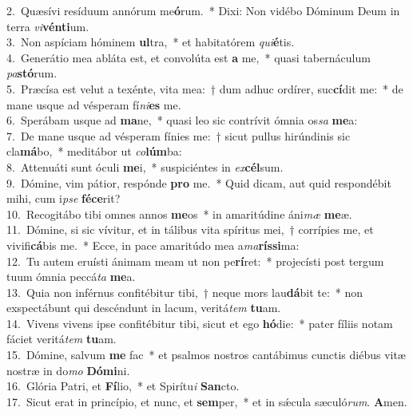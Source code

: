{2.~}Quæsívi resíduum annórum me\textbf{ó}rum.~* Dixi: Non vidébo Dóminum Deum in terra \textit{vi}\textbf{vén}\textbf{ti}um.\\
{3.~}Non aspíciam hóminem \textbf{ul}tra,~* et habitatórem \textit{qui}\textbf{é}tis.\\
{4.~}Generátio mea abláta est, et convolúta est \textbf{a} me,~* quasi tabernáculum \textit{pa}\textbf{stó}rum.\\
{5.~}Præcísa est velut a texénte, vita mea:~† dum adhuc ordírer, suc\textbf{cí}dit me:~* de mane usque ad vésperam fí\textit{ni}\textbf{es} me.\\
{6.~}Sperábam usque ad \textbf{ma}ne,~* quasi leo sic contrívit ómnia os\textit{sa} \textbf{me}a:\\
{7.~}De mane usque ad vésperam fínies me:~† sicut pullus hirúndinis sic cla\textbf{má}bo,~* meditábor ut \textit{co}\textbf{lúm}ba:\\
{8.~}Attenuáti sunt óculi \textbf{me}i,~* suspiciéntes in \textit{ex}\textbf{cél}sum.\\
{9.~}Dómine, vim pátior, respónde \textbf{pro} me.~* Quid dicam, aut quid respondébit mihi, cum i\textit{pse} \textbf{fé}\textbf{ce}rit?\\
{10.~}Recogitábo tibi omnes annos \textbf{me}os~* in amaritúdine áni\textit{mæ} \textbf{me}æ.\\
{11.~}Dómine, si sic vívitur, et in tálibus vita spíritus mei,~† corrípies me, et vivifi\textbf{cá}bis me.~* Ecce, in pace amaritúdo mea a\textit{ma}\textbf{rís}\textbf{si}ma:\\
{12.~}Tu autem eruísti ánimam meam ut non pe\textbf{rí}ret:~* projecísti post tergum tuum ómnia peccá\textit{ta} \textbf{me}a.\\
{13.~}Quia non inférnus confitébitur tibi,~† neque mors lau\textbf{dá}bit te:~* non exspectábunt qui descéndunt in lacum, veritá\textit{tem} \textbf{tu}am.\\
{14.~}Vivens vivens ipse confitébitur tibi, sicut et ego \textbf{hó}die:~* pater fíliis notam fáciet veritá\textit{tem} \textbf{tu}am.\\
{15.~}Dómine, salvum \textbf{me} fac~* et psalmos nostros cantábimus cunctis diébus vitæ nostræ in do\textit{mo} \textbf{Dó}\textbf{mi}ni.\\
{16.~}Glória Patri, et \textbf{Fí}lio,~* et Spirítu\textit{i} \textbf{San}cto.\\
{17.~}Sicut erat in princípio, et nunc, et \textbf{sem}per,~* et in sǽcula sæculó\textit{rum}. \textbf{A}men.\\
